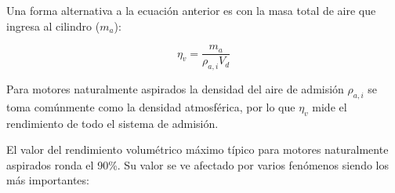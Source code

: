 
Una forma alternativa a la ecuación anterior es con la masa total de aire que
ingresa al cilindro ($m_{a}$):

\begin{equation}\label{eq:eta_v}
  \eta_v = \frac{m_a}{\rho_{a,i}V_d}
\end{equation}

Para motores naturalmente aspirados la densidad del aire de admisión
$\rho_{a,i}$ se toma comúnmente como la densidad atmosférica, por lo que $\eta_v$
mide el rendimiento de todo el sistema de admisión.
%

El valor del rendimiento volumétrico máximo típico para motores naturalmente
aspirados ronda el 90\%.
%
Su valor se ve afectado por varios fenómenos siendo los más importantes:

